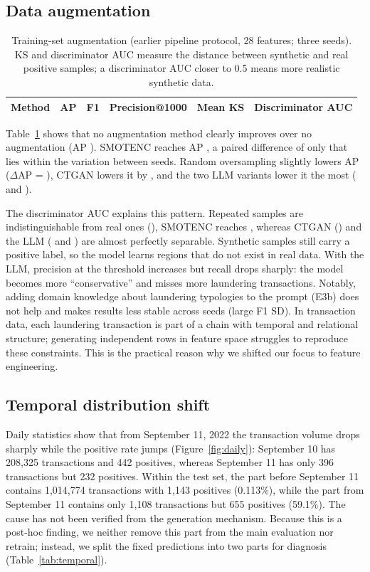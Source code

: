 \documentclass[sigconf,nonacm]{acmart}
\begin{document}
\subsection{Data augmentation}

\begin{table}[t]
\caption{Training-set augmentation (earlier pipeline protocol, 28 features; three seeds). KS and discriminator AUC
measure the distance between synthetic and real positive samples; a discriminator AUC closer to 0.5 means more
realistic synthetic data.}
\label{tab:aug}
\begin{tabular}{lccccc}
\toprule
Method & AP & F1 & Precision@1000 & Mean KS & Discriminator AUC \\
\midrule

\end{tabular}
\end{table}

Table~\ref{tab:aug} shows that no augmentation method clearly improves over no augmentation (AP \EZeroAP). SMOTENC
reaches AP \EOneAP, a paired difference of only \EOneDelta{} that lies within the variation between seeds. Random
oversampling slightly lowers AP ($\Delta$AP = \ERDelta), CTGAN lowers it by \ETwoDelta, and the two LLM variants
lower it the most (\ELLMaDelta{} and \ELLMbDelta).

The discriminator AUC explains this pattern. Repeated samples are indistinguishable from real ones (\ERDisc), SMOTENC
reaches \EOneDisc, whereas CTGAN (\ETwoDisc) and the LLM (\ELLMaDisc{} and \ELLMbDisc) are almost perfectly
separable. Synthetic samples still carry a positive label, so the model learns regions that do not exist in real
data. With the LLM, precision at the threshold increases but recall drops sharply: the model becomes more
``conservative'' and misses more laundering transactions. Notably, adding domain knowledge about laundering
typologies to the prompt (E3b) does not help and makes results less stable across seeds (large F1 SD). In
transaction data, each laundering transaction is part of a chain with temporal and relational structure; generating
independent rows in feature space struggles to reproduce these constraints. This is the practical reason why we
shifted our focus to feature engineering.

\subsection{Temporal distribution shift}

Daily statistics show that from September 11, 2022 the transaction volume drops sharply while the positive rate
jumps (Figure~\ref{fig:daily}): September 10 has 208,325 transactions and 442 positives, whereas September 11 has
only 396 transactions but 232 positives. Within the test set, the part before September 11 contains 1,014,774
transactions with 1,143 positives (0.113\%), while the part from September 11 contains only 1,108 transactions but 655
positives (59.1\%). The cause has not been verified from the generation mechanism. Because this is a post-hoc
finding, we neither remove this part from the main evaluation nor retrain; instead, we split the fixed predictions
into two parts for diagnosis (Table~\ref{tab:temporal}).
\end{document}
